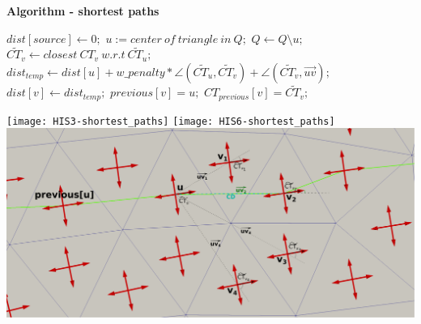 \documentclass[a0paper,portrait, fontscale=0.33]{baposter}
\begin{document}
\begin{poster}
{\begin{minipage}[b]{0.53\linewidth}
\vspace{0.57cm}	
\textbf{Algorithm - shortest paths}
 \begin{flushleft} 
	\begin{algorithmic}[1]
\State $dist[source]\gets 0;$
\State $u:= center\ of\ triangle\ in\ Q;$
\State $Q\gets Q\setminus u;$
\EndIf
{}
\State $\widetilde{CT_v}\gets closest\ {CT_v}\ w.r.t\ \widetilde{CT_u};$
\State $dist_{temp}\gets dist[u] + w\_penalty * \angle(\widetilde{CT_u}, \widetilde{CT_v}) + \angle(\widetilde{CT_v}, \overrightarrow{uv});$
\State $dist[v]\gets dist_{temp};$
\State $previous[v] = u;$
\State $CT_{previous}[v] = \widetilde{CT_v};$
\EndIf
\EndFor
\EndWhile
\end{algorithmic}
\end{flushleft}
\end{minipage}
\vspace{0.05\linewidth}
\begin{minipage}[b]{0.465\linewidth}	%
\texttt{[image: HIS3-shortest\_paths]}
\label{fig:figure11}	 
\vspace{0.2cm}	
\texttt{[image: HIS6-shortest\_paths]}
\label{fig:figure12}	%
\vspace{0.2cm}	
 \includegraphics[width=\textwidth]{shortestPaths-zoom2}
	\label{fig:figure1}	
	

\end{minipage}}
\end{poster}
\end{document}
